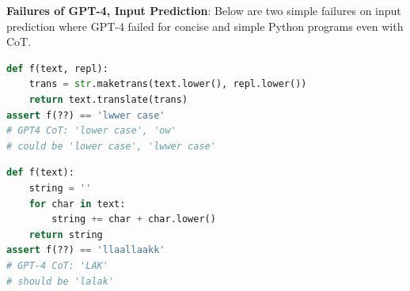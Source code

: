 \documentclass[twoside,11pt,preprint]{article}
\begin{document}
\textbf{Failures of GPT-4, Input Prediction}: Below are two simple failures on input prediction where GPT-4 failed for concise and simple Python programs even with CoT.

\begin{lstlisting}[caption={},label={lst:gpt-4-input-fail1}, breaklines=true, language=python]
def f(text, repl):
    trans = str.maketrans(text.lower(), repl.lower())
    return text.translate(trans)
assert f(??) == 'lwwer case'
# GPT4 CoT: 'lower case', 'ow'
# could be 'lower case', 'lwwer case'
\end{lstlisting}
\begin{lstlisting}[caption={},label={lst:gpt-4-input-fail2}, breaklines=true, language=python]
def f(text):
    string = ''
    for char in text:
        string += char + char.lower()
    return string
assert f(??) == 'llaallaakk'
# GPT-4 CoT: 'LAK'
# should be 'lalak'
\end{lstlisting}





\end{document}
